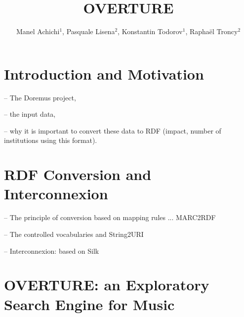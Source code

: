 \documentclass[runningheads,a4paper]{llncs}
\begin{document}
\title{OVERTURE}


\author{Manel Achichi$^1$, Pasquale Lisena$^2$, Konstantin Todorov$^1$, Rapha\"{e}l Troncy$^2$}

\maketitle


\begin{abstract}

\end{abstract}


\section{Introduction and Motivation}

-- The Doremus project,

-- the input data,

-- why it is important to convert these data to RDF (impact, number of institutions using this format).


\section{RDF Conversion and Interconnexion}

-- The principle of conversion based on mapping rules ... MARC2RDF

-- The controlled vocabularies and String2URI

-- Interconnexion: based on Silk


\section{OVERTURE: an Exploratory Search Engine for Music}
\end{document}
